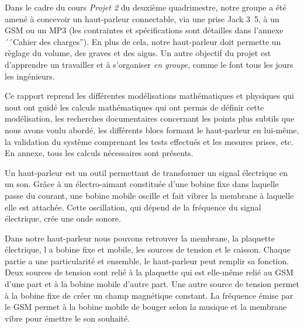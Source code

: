 

Dans le cadre du cours \textit{Projet 2} du deuxième quadrimestre, notre groupe a été amené à 
concevoir un haut-parleur connectable, via une prise Jack \unit{3.5}{\milli\meter}, à un 
GSM ou un MP3 (les contraintes et spécifications sont détailles dans l'annexe ´´Cahier des charges''). 
En plus de cela, notre haut-parleur doit permette un règlage du volume, des graves
et des aigus. Un autre objectif du projet est d'apprendre un travailler et à s'organiser \textit{en groupe}, 
comme le font tous les jours les ingénieurs.

Ce rapport reprend les différentes modélisations mathématiques et physiques
qui nout ont guidé
les calculs mathématiques qui ont permis de définir cette modélisation, 
les recherches documentaires concernant les points plus subtils que nous 
avons voulu abordé, les différents blocs formant le haut-parleur en 
lui-même, la validation du système comprenant les tests effectués et 
les mesures prises, etc. En annexe, tous les calculs nécessaires sont présents.

Un haut-parleur est un outil permettant de transformer un signal 
électrique en un son. Grâce à un électro-aimant constituée d'une 
bobine fixe dans laquelle passe du courant, une bobine mobile 
oscille et fait vibrer la membrane à laquelle elle est attachée. 
Cette oscillation, qui dépend de la fréquence du signal électrique, 
crée une onde sonore.

Dans notre haut-parleur nous pouvons retrouver la membrane, la plaquette électrique, l
a bobine fixe et mobile, les sources de tension et le caisson.  Chaque partie a 
une particularité et ensemble, le haut-parleur peut remplir sa fonction.  Deux sources
de tension sont relié à la plaquette qui est elle-même relié au GSM d’une part et à 
la bobine mobile d’autre part.  Une autre source de tension permet à la bobine fixe de 
créer un champ magnétique constant.  La fréquence émise par le GSM permet à la bobine 
mobile de bouger selon la musique et la membrane vibre pour émettre le son souhaité.

